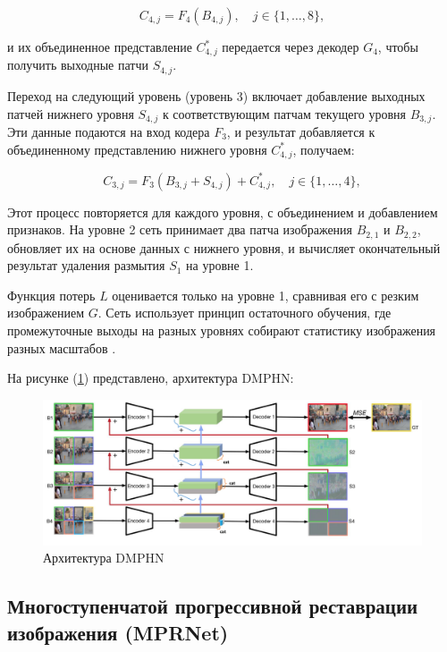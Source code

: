 \begin{equation}
	C_{4,j} = F_{4}(B_{4,j}), \quad j \in \{1, \dots, 8\},
\end{equation}

и их объединенное представление \(C_{4,j}^{\ast}\) передается через декодер \(G_{4}\), чтобы получить выходные патчи \(S_{4,j}\).

Переход на следующий уровень (уровень 3) включает добавление выходных патчей нижнего уровня \(S_{4,j}\) к соответствующим патчам текущего уровня \(B_{3,j}\). Эти данные подаются на вход кодера \(F_{3}\), и результат добавляется к объединенному представлению нижнего уровня \(C_{4,j}^{\ast}\), получаем:

\begin{equation}
	C_{3,j} = F_{3}(B_{3,j} + S_{4,j}) + C_{4,j}^{\ast}, \quad j \in \{1, \dots, 4\},
\end{equation}

Этот процесс повторяется для каждого уровня, с объединением и добавлением признаков. На уровне 2 сеть принимает два патча изображения \(B_{2,1}\) и \(B_{2,2}\), обновляет их на основе данных с нижнего уровня, и вычисляет окончательный результат удаления размытия \(S_{1}\) на уровне 1.

Функция потерь \(L\) оценивается только на уровне 1, сравнивая его с резким изображением \(G\). Сеть использует принцип остаточного обучения, где промежуточные выходы на разных уровнях собирают статистику изображения разных масштабов \cite{zhang2019deep}.

На рисунке (\ref{fig:dmphn}) представлено, архитектура DMPHN: 
\begin{figure}[H]
	\centering
	\includegraphics[width=0.8\linewidth]{assets/DMPHN.png}
	\caption{Архитектура DMPHN}
	\label{fig:dmphn}
\end{figure}


\subsection{Многоступенчатой прогрессивной реставрации изображения (MPRNet)}

